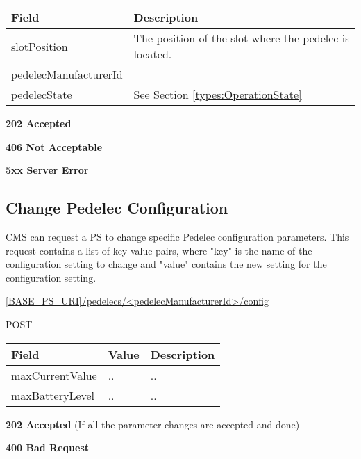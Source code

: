 \begin{table}[!h]
\vspace{-7mm}
\begin{tabularx}{\linewidth}{ | l | X | }
  \hline
  \rowcolor{table-head}
  Field & Description \\
  \hline
  slotPosition	& The position of the slot where the pedelec is located. \\
  pedelecManufacturerId		&  \\
  pedelecState 			& See Section \ref{types:OperationState} \\
  \hline
\end{tabularx}
\end{table}

 \textbf{202 Accepted}

 \textbf{406 Not Acceptable}

\textbf{5xx Server Error}

\subsection{Change Pedelec Configuration}
\label{cms:change-pedelec-conf}

\acs{CMS} can request a \acs{PS} to change specific Pedelec configuration parameters. This request contains a list of key-value pairs, where "key" is the name of the configuration setting to change and "value" contains the new setting for the configuration setting.

 \url{[BASE_PS_URI]/pedelecs/<pedelecManufacturerId>/config}

 POST

\newpage
{} 
\begin{table}[!h]
\vspace{-7mm}
\begin{tabularx}{\linewidth}{ | l | l | X | }
  \hline
  \rowcolor{table-head}
  Field & Value & Description \\
  \hline
	maxCurrentValue & .. & .. \\
	maxBatteryLevel & .. & .. \\
  \hline
\end{tabularx}
\end{table}

\textbf{202 Accepted} (If all the parameter changes are accepted and done)

 \textbf{400 Bad Request}

